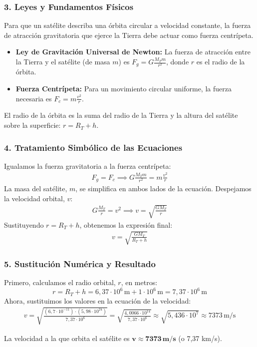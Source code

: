 \subsubsection*{3. Leyes y Fundamentos Físicos}
Para que un satélite describa una órbita circular a velocidad constante, la fuerza de atracción gravitatoria que ejerce la Tierra debe actuar como fuerza centrípeta.
\begin{itemize}
    \item \textbf{Ley de Gravitación Universal de Newton:} La fuerza de atracción entre la Tierra y el satélite (de masa $m$) es $F_g = G \frac{M_T m}{r^2}$, donde $r$ es el radio de la órbita.
    \item \textbf{Fuerza Centrípeta:} Para un movimiento circular uniforme, la fuerza necesaria es $F_c = m \frac{v^2}{r}$.
\end{itemize}
El radio de la órbita es la suma del radio de la Tierra y la altura del satélite sobre la superficie: $r = R_T + h$.

\subsubsection*{4. Tratamiento Simbólico de las Ecuaciones}
Igualamos la fuerza gravitatoria a la fuerza centrípeta:
\begin{gather}
    F_g = F_c \implies G \frac{M_T m}{r^2} = m \frac{v^2}{r}
\end{gather}
La masa del satélite, $m$, se simplifica en ambos lados de la ecuación. Despejamos la velocidad orbital, $v$:
\begin{gather}
    G \frac{M_T}{r} = v^2 \implies v = \sqrt{\frac{G M_T}{r}}
\end{gather}
Sustituyendo $r = R_T + h$, obtenemos la expresión final:
\begin{gather}
    v = \sqrt{\frac{G M_T}{R_T + h}}
\end{gather}

\subsubsection*{5. Sustitución Numérica y Resultado}
Primero, calculamos el radio orbital, $r$, en metros:
$$ r = R_T + h = 6,37 \cdot 10^6 \, \text{m} + 1 \cdot 10^6 \, \text{m} = 7,37 \cdot 10^6 \, \text{m} $$
Ahora, sustituimos los valores en la ecuación de la velocidad:
\begin{gather}
    v = \sqrt{\frac{(6,7 \cdot 10^{-11}) \cdot (5,98 \cdot 10^{24})}{7,37 \cdot 10^6}} = \sqrt{\frac{4,0066 \cdot 10^{14}}{7,37 \cdot 10^6}} \approx \sqrt{5,436 \cdot 10^7} \approx 7373 \, \text{m/s}
\end{gather}
\begin{cajaresultado}
La velocidad a la que orbita el satélite es $\boldsymbol{v \approx 7373 \, \textbf{m/s}}$ (o 7,37 km/s).
\end{cajaresultado}

